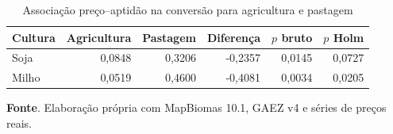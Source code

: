 \begin{table}[htbp]
\centering
\footnotesize
\setlength{\tabcolsep}{4pt}
\captionstyle{\centering}
\normalcaption
\caption{Associação preço--aptidão na conversão para agricultura e pastagem}
\label{tab:h1-contraste-destinos}
\begin{tabular}{lrrrrr}
\toprule
Cultura & Agricultura & Pastagem & Diferença & $p$ bruto & $p$ Holm \\
\midrule
Soja & 0,0848 & 0,3206 & -0,2357 & 0,0145 & 0,0727 \\
Milho & 0,0519 & 0,4600 & -0,4081 & 0,0034 & 0,0205 \\
\bottomrule
\end{tabular}
\par\smallskip\begin{minipage}{\textwidth}\footnotesize
\SingleSpacing
\noindent\textbf{Fonte}. Elaboração própria com MapBiomas 10.1, GAEZ v4 e séries de preços reais.
\end{minipage}
\end{table}
